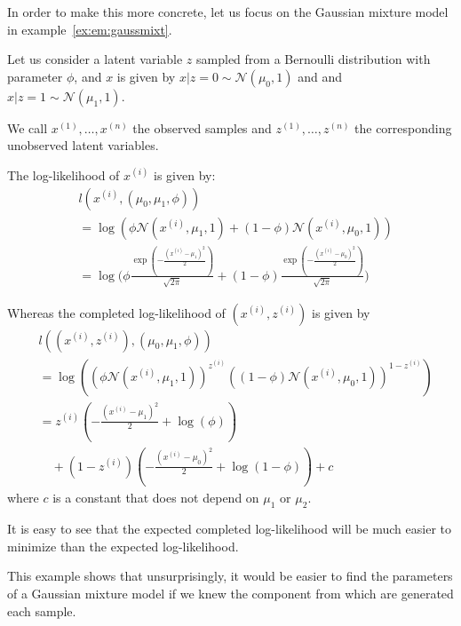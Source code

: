 In order to make this more concrete, let us focus on the Gaussian mixture model
in example~\ref{ex:em:gaussmixt}.
\begin{example}
  \label{ex:em:gaussmixt}
  Let us consider a latent variable $z$
  sampled from a Bernoulli distribution with parameter $\phi$, 
  and $x$ is given by
  $x|z=0 \sim \mathcal{N}(\mu_0, 1)$ and 
  and $x | z=1 \sim \mathcal{N}(\mu_1, 1)$.

  We call $x^{(1)}, \dots, x^{(n)}$ the observed samples and $z^{(1)}, \dots,
  z^{(n)}$ the corresponding unobserved latent variables. 

  The log-likelihood of $x^{(i)}$ is given by:
  \begin{align}
    &l(x^{(i)}, (\mu_0, \mu_1, \phi)) \\ &= \log(\phi \mathcal{N}(x^{(i)}, \mu_1, 1) + (1 - \phi) \mathcal{N}(x^{(i)}, \mu_0, 1)) \\
                                                   &= \log\Big( \phi\frac{\exp(-\frac{(x^{(i)} - \mu_1)^2}{2})}{\sqrt{2 \pi}} + (1 - \phi)\frac{\exp(-\frac{(x^{(i)} - \mu_0)^2}{2})}{\sqrt{2 \pi}} \Big)
  \end{align}

  Whereas the completed log-likelihood of $(x^{(i)}, z^{(i)})$ is given by
  \begin{align}
    &l((x^{(i)}, z^{(i)}), (\mu_0, \mu_1, \phi)) \\
    &= \log((\phi \mathcal{N}(x^{(i)}, \mu_1, 1))^{z^{(i)}} ((1 - \phi) \mathcal{N}(x^{(i)}, \mu_0, 1))^{1- z^{(i)}}) \\
    &= z^{(i)} ( -\frac{(x^{(i)} - \mu_1)^2}{2} + \log(\phi)) \\ &\enspace \enspace + (1 - z^{(i)}) ( -\frac{(x^{(i)} - \mu_0)^2}{2} + \log(1 -\phi)) + c
  \end{align}
  where $c$ is a constant that does not depend on $\mu_1$ or $\mu_2$.

  It is easy to see that the expected completed log-likelihood will be
  much easier to minimize than the expected log-likelihood.
\end{example}
This example shows that unsurprisingly, it would be easier to find the parameters of a
Gaussian mixture model if we knew the component from which are generated each sample.

